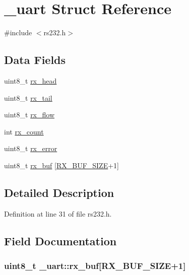 \hypertarget{struct__uart}{\section{\-\_\-uart Struct Reference}
\label{struct__uart}
}


{\ttfamily \#include $<$rs232.\-h$>$}

\subsection*{Data Fields}
\begin{DoxyCompactItemize}
\item 
uint8\-\_\-t \hyperlink{struct__uart_add14728bfbde14b7c260c8ff09bcd91b}{rx\-\_\-head}
\item 
uint8\-\_\-t \hyperlink{struct__uart_a4bd6a544526fe5ac94a5f9af09e3bbeb}{rx\-\_\-tail}
\item 
uint8\-\_\-t \hyperlink{struct__uart_a193691b69079880daf5b5b9894fb6aa5}{rx\-\_\-flow}
\item 
int \hyperlink{struct__uart_a50b344402c339343e3f32c82358e190c}{rx\-\_\-count}
\item 
uint8\-\_\-t \hyperlink{struct__uart_a6c0b44754c36dd831e1da4f02b124167}{rx\-\_\-error}
\item 
uint8\-\_\-t \hyperlink{struct__uart_a68a8939d4be8a563157c98b5baa50ae0}{rx\-\_\-buf} \mbox{[}\hyperlink{rs232_8h_a690f985c933da2ce6fe62b6c61dfa662}{R\-X\-\_\-\-B\-U\-F\-\_\-\-S\-I\-Z\-E}+1\mbox{]}
\end{DoxyCompactItemize}


\subsection{Detailed Description}


Definition at line 31 of file rs232.\-h.



\subsection{Field Documentation}
\hypertarget{struct__uart_a68a8939d4be8a563157c98b5baa50ae0}{
\subsubsection[{rx\-\_\-buf}]{\setlength{\rightskip}{0pt plus 5cm}uint8\-\_\-t \-\_\-uart\-::rx\-\_\-buf\mbox{[}{\bf R\-X\-\_\-\-B\-U\-F\-\_\-\-S\-I\-Z\-E}+1\mbox{]}}}\label{struct__uart_a68a8939d4be8a563157c98b5baa50ae0}


